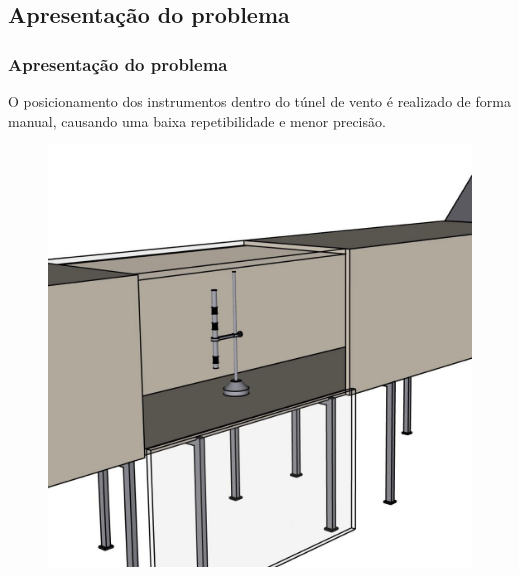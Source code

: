 \subsection{Apresentação do problema}


\begin{frame}
    \frametitle{Apresentação do problema}
    O posicionamento dos instrumentos dentro do túnel de vento é realizado de forma manual,
    causando uma baixa repetibilidade e menor precisão.
    \begin{figure}
        \centering
        \includegraphics[scale = 0.1]{figuras/sisantigozoom}
    \end{figure}
\end{frame}